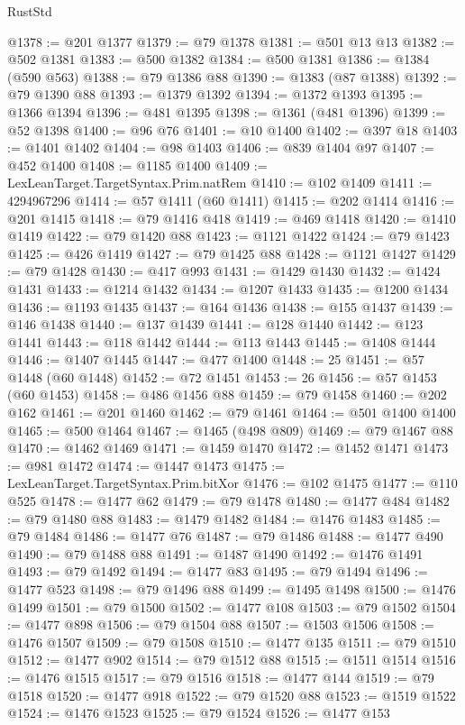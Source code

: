 \begin{lexlean}{RustStd}
\begin{coremodule}
@1378 := @201 @1377
@1379 := @79 @1378
@1381 := @501 @13 @13
@1382 := @502 @1381
@1383 := @500 @1382
@1384 := @500 @1381
@1386 := @1384 (@590 @563)
@1388 := @79 @1386 @88
@1390 := @1383 (@87 @1388)
@1392 := @79 @1390 @88
@1393 := @1379 @1392
@1394 := @1372 @1393
@1395 := @1366 @1394
@1396 := @481 @1395
@1398 := @1361 (@481 @1396)
@1399 := @52 @1398
@1400 := @96 @76
@1401 := @10 @1400
@1402 := @397 @18
@1403 := @1401 @1402
@1404 := @98 @1403
@1406 := @839 @1404 @97
@1407 := @452 @1400
@1408 := @1185 @1400
@1409 := LexLeanTarget.TargetSyntax.Prim.natRem
@1410 := @102 @1409
@1411 := 4294967296
@1414 := @57 @1411 (@60 @1411)
@1415 := @202 @1414
@1416 := @201 @1415
@1418 := @79 @1416 @418
@1419 := @469 @1418
@1420 := @1410 @1419
@1422 := @79 @1420 @88
@1423 := @1121 @1422
@1424 := @79 @1423
@1425 := @426 @1419
@1427 := @79 @1425 @88
@1428 := @1121 @1427
@1429 := @79 @1428
@1430 := @417 @993
@1431 := @1429 @1430
@1432 := @1424 @1431
@1433 := @1214 @1432
@1434 := @1207 @1433
@1435 := @1200 @1434
@1436 := @1193 @1435
@1437 := @164 @1436
@1438 := @155 @1437
@1439 := @146 @1438
@1440 := @137 @1439
@1441 := @128 @1440
@1442 := @123 @1441
@1443 := @118 @1442
@1444 := @113 @1443
@1445 := @1408 @1444
@1446 := @1407 @1445
@1447 := @477 @1400
@1448 := 25
@1451 := @57 @1448 (@60 @1448)
@1452 := @72 @1451
@1453 := 26
@1456 := @57 @1453 (@60 @1453)
@1458 := @486 @1456 @88
@1459 := @79 @1458
@1460 := @202 @162
@1461 := @201 @1460
@1462 := @79 @1461
@1464 := @501 @1400 @1400
@1465 := @500 @1464
@1467 := @1465 (@498 @809)
@1469 := @79 @1467 @88
@1470 := @1462 @1469
@1471 := @1459 @1470
@1472 := @1452 @1471
@1473 := @981 @1472
@1474 := @1447 @1473
@1475 := LexLeanTarget.TargetSyntax.Prim.bitXor
@1476 := @102 @1475
@1477 := @110 @525
@1478 := @1477 @62
@1479 := @79 @1478
@1480 := @1477 @484
@1482 := @79 @1480 @88
@1483 := @1479 @1482
@1484 := @1476 @1483
@1485 := @79 @1484
@1486 := @1477 @76
@1487 := @79 @1486
@1488 := @1477 @490
@1490 := @79 @1488 @88
@1491 := @1487 @1490
@1492 := @1476 @1491
@1493 := @79 @1492
@1494 := @1477 @83
@1495 := @79 @1494
@1496 := @1477 @523
@1498 := @79 @1496 @88
@1499 := @1495 @1498
@1500 := @1476 @1499
@1501 := @79 @1500
@1502 := @1477 @108
@1503 := @79 @1502
@1504 := @1477 @898
@1506 := @79 @1504 @88
@1507 := @1503 @1506
@1508 := @1476 @1507
@1509 := @79 @1508
@1510 := @1477 @135
@1511 := @79 @1510
@1512 := @1477 @902
@1514 := @79 @1512 @88
@1515 := @1511 @1514
@1516 := @1476 @1515
@1517 := @79 @1516
@1518 := @1477 @144
@1519 := @79 @1518
@1520 := @1477 @918
@1522 := @79 @1520 @88
@1523 := @1519 @1522
@1524 := @1476 @1523
@1525 := @79 @1524
@1526 := @1477 @153

\end{coremodule}
\end{lexlean}
